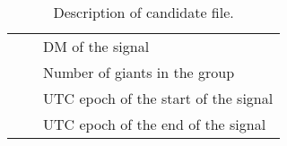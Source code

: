 \begin{table}[]
\begin{tabular}{lll}
																																																									&                                                            & DM of the signal                                                                                                     \\
																																																									&                                                            & Number of giants in the group                                                                                        \\
																																																									&                                                            & UTC epoch of the start of the signal                                                                                 \\
																																																									&                                                            & UTC epoch of the end of the signal                                                                                 \\ 
		\bottomrule
 \end{tabular}
	\caption{Description of candidate file.}
\end{table}
